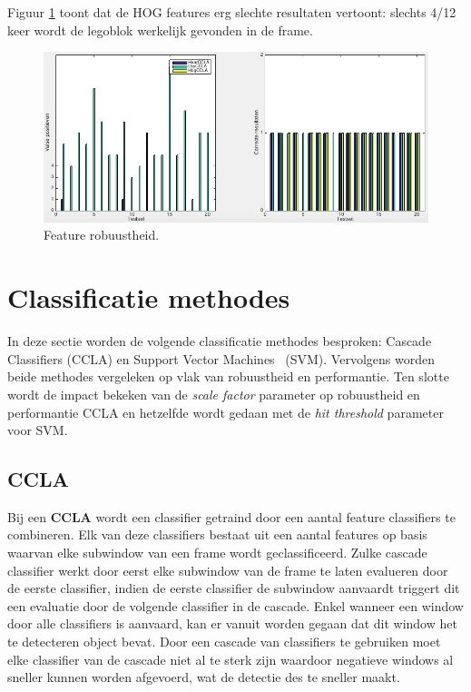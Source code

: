 Figuur \ref{fig:featRobuust} toont dat de HOG features erg slechte resultaten vertoont: slechts 4/12 keer wordt de legoblok werkelijk gevonden in de frame.

\begin{figure}
  \centering
  \includegraphics[width=\linewidth]{img/FeatRobust}
  \caption{Feature robuustheid.}
  \label{fig:featRobuust}
\end{figure}

\section{Classificatie methodes} \label{sec:class}
In deze sectie worden de volgende classificatie methodes besproken: Cascade Classifiers \cite{viola2001rapid} (CCLA) en Support Vector Machines~\cite{joachims1999svmlight} (SVM). Vervolgens worden beide methodes vergeleken op vlak van robuustheid en performantie. Ten slotte wordt de impact bekeken van de \textit{scale factor} parameter op robuustheid en performantie CCLA en hetzelfde wordt gedaan met de \textit{hit threshold} parameter voor SVM.

\subsection{CCLA} \label{sec:class_ccla}
Bij een \textbf{CCLA} wordt een classifier getraind door een aantal feature classifiers te combineren. Elk van deze classifiers bestaat uit een aantal features op basis waarvan elke subwindow van een frame wordt geclassificeerd. Zulke cascade classifier werkt door eerst elke subwindow van de frame te laten evalueren door de eerste classifier, indien de eerste classifier de subwindow aanvaardt triggert dit een evaluatie door de volgende classifier in de cascade. Enkel wanneer een window door alle classifiers is aanvaard, kan er vanuit worden gegaan dat dit window het te detecteren object bevat. Door een cascade van classifiers te gebruiken moet elke classifier van de cascade niet al te sterk zijn waardoor negatieve windows al sneller kunnen worden afgevoerd, wat de detectie des te sneller maakt.

